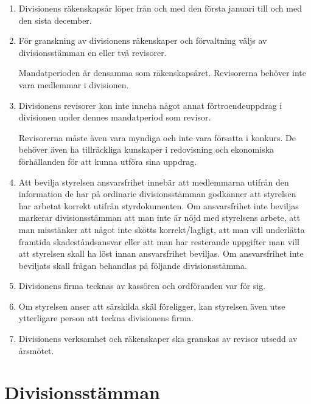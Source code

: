 \documentclass{dvd}
\begin{document}
	\begin{enumerate}[label=\arabic* §, ref=\arabic*]

		\item Divisionens räkenskapsår löper från och med den första januari till och med den sista december.

		\item För granskning av divisionens räkenskaper och förvaltning väljs av divisionsstämman en eller två revisorer.

		Mandatperioden är densamma som räkenskapsåret.
		Revisorerna behöver inte vara medlemmar i divisionen.

		\item Divisionens revisorer kan inte inneha något annat förtroendeuppdrag i divisionen under dennes mandatperiod som revisor.

		Revisorerna måste även vara myndiga och inte vara försatta i konkurs.
		De behöver även ha tillräckliga kunskaper i redovisning och ekonomiska förhållanden för att kunna utföra sina uppdrag.

		\item Att bevilja styrelsen ansvarsfrihet innebär att medlemmarna utifrån den information de har på ordinarie divisionsstämman godkänner att styrelsen har arbetat korrekt utifrån styrdokumenten.
		Om ansvarsfrihet inte beviljas markerar divisionsstämman att man inte är nöjd med styrelsens arbete, att man misstänker att något inte skötts korrekt/lagligt, att man vill underlätta framtida skadeståndsansvar eller att man har resterande uppgifter man vill att styrelsen skall ha löst innan ansvarsfrihet beviljas.
		Om ansvarsfrihet inte beviljats skall frågan behandlas på följande divisionsstämma.

		\item Divisionens firma tecknas av kassören och ordföranden var för sig.

		\item Om styrelsen anser att särskilda skäl föreligger, kan styrelsen även utse ytterligare person att teckna divisionens firma.

		\item Divisionens verksamhet och räkenskaper ska granskas av revisor utsedd av årsmötet.

	\end{enumerate}

	\section{Divisionsstämman}
\end{document}

